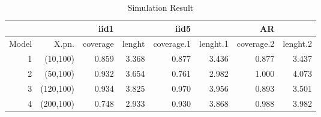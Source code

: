 \documentclass[11pt,oneside, a4paper]{amsart}\usepackage[]{graphicx}\usepackage[]{color}
\begin{document}
\begin{table}[ht]
\centering
\caption{Simulation Result} 
\label{Test_table}
{\footnotesize
\begin{tabular}{|r|r|rr|rr|rr|}
  \toprule 
    &  & iid1 &  & iid5 & & AR & \\
 \midrule 
Model & X.pn. & coverage & lenght & coverage.1 & lenght.1 & coverage.2 & lenght.2 \\ 
    1 & (10,100) & 0.859 & 3.368 & 0.877 & 3.436 & 0.877 & 3.437 \\ 
     2 & (50,100) & 0.932 & 3.654 & 0.761 & 2.982 & 1.000 & 4.073 \\ 
     3 & (120,100) & 0.934 & 3.825 & 0.970 & 3.956 & 0.893 & 3.501 \\ 
     4 & (200,100) & 0.748 & 2.933 & 0.930 & 3.868 & 0.988 & 3.982 \\ 
   \bottomrule 
\end{tabular}
}
\end{table}
\end{document}
